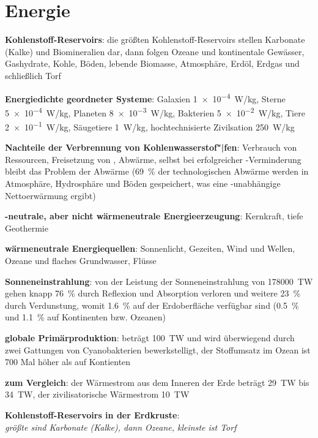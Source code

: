 \pagebreak

\section{%
    Energie%
}

\textbf{Kohlenstoff-Reservoirs}:
die größten Kohlenstoff-Reservoirs stellen Karbonate (Kalke) und Biomineralien dar,
dann folgen Ozeane und kontinentale Gewässer,
Gashydrate,
Kohle,
Böden,
lebende Biomasse,
Atmosphäre,
Erdöl,
Erdgas und
schließlich Torf

\textbf{Energiedichte geordneter Systeme}:
Galaxien \SI{1e-4}{\watt/\kilogram},
Sterne \SI{5e-4}{\watt/\kilogram},
Planeten \SI{8e-3}{\watt/\kilogram},
Bakterien \SI{5e-2}{\watt/\kilogram},
Tiere \SI{2e-1}{\watt/\kilogram},
Säugetiere \SI{1}{\watt/\kilogram},
hochtechnisierte Zivilsation \SI{250}{\watt/\kilogram}

\textbf{Nachteile der Verbrennung von Kohlenwasserstof"|fen}:
Verbrauch von Ressourcen,
Freisetzung von ,
Abwärme,
selbst bei erfolgreicher -Verminderung bleibt das Problem der Abwärme
(\SI{69}{\percent} der technologischen Abwärme werden in Atmosphäre, Hydrosphäre und Böden
gespeichert, was eine -unabhängige Nettoerwärmung ergibt)

\textbf{-neutrale, aber nicht wärmeneutrale Energieerzeugung}:
Kernkraft,
tiefe Geothermie

\textbf{wärmeneutrale Energiequellen}:
Sonnenlicht,
Gezeiten,
Wind und Wellen,
Ozeane und flaches Grundwasser,
Flüsse

\textbf{Sonneneinstrahlung}:
von der Leistung der Sonneneinstrahlung von \SI{178000}{\tera\watt}
gehen knapp \SI{76}{\percent} durch Reflexion und Absorption verloren
und weitere \SI{23}{\percent} durch Verdunstung,
womit \SI{1.6}{\percent} auf der Erdoberfläche verfügbar sind
(\SI{0.5}{\percent} und \SI{1.1}{\percent} auf Kontinenten bzw. Ozeanen)

\textbf{globale Primärproduktion}:
beträgt \SI{100}{\tera\watt} und wird überwiegend durch zwei Gattungen von Cyanobakterien
bewerkstelligt,
der Stoffumsatz im Ozean ist 700 Mal höher als auf Kontienten

\textbf{zum Vergleich}:
der Wärmestrom aus dem Inneren der Erde beträgt \SI{29}{\tera\watt} bis \SI{34}{\tera\watt},
der zivilisatorische Wärmestrom \SI{10}{\tera\watt}

\begin{wichtig}
    \item
    \textbf{Kohlenstoff-Reservoirs in der Erdkruste}:\\
    \emph{größte sind Karbonate (Kalke), dann Ozeane, kleinste ist Torf}
\end{wichtig}

\pagebreak
